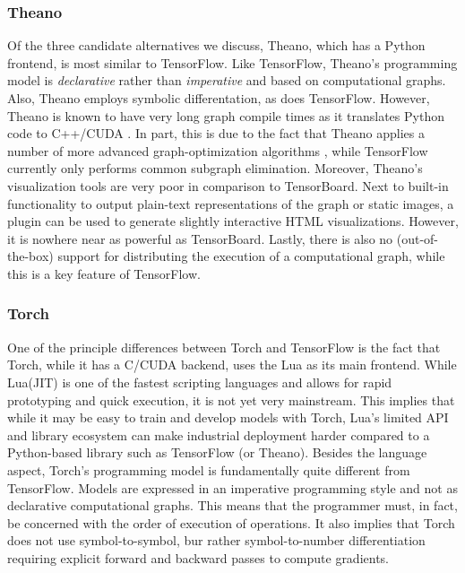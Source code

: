 \subsubsection{Theano}\label{sec:comp-quality-theano}

Of the three candidate alternatives we discuss, Theano, which has a Python
frontend, is most similar to TensorFlow. Like TensorFlow, Theano's programming
model is \emph{declarative} rather than \emph{imperative} and based on
computational graphs. Also, Theano employs symbolic differentation, as does
TensorFlow. However, Theano is known to have very long graph compile times as it
translates Python code to C++/CUDA \cite{theano}. In part, this is due to the
fact that Theano applies a number of more advanced graph-optimization algorithms
\cite{theano}, while TensorFlow currently only performs common subgraph
elimination. Moreover, Theano's visualization tools are very poor in comparison
to TensorBoard. Next to built-in functionality to output plain-text
representations of the graph or static images, a plugin can be used to generate
slightly interactive HTML visualizations. However, it is nowhere near as
powerful as TensorBoard. Lastly, there is also no (out-of-the-box) support for
distributing the execution of a computational graph, while this is a key feature
of TensorFlow.

\subsubsection{Torch}\label{sec:comp-quality-torch}

One of the principle differences between Torch and TensorFlow is the fact that
Torch, while it has a C/CUDA backend, uses the Lua as its main frontend. While
Lua(JIT) is one of the fastest scripting languages and allows for rapid
prototyping and quick execution, it is not yet very mainstream. This implies
that while it may be easy to train and develop models with Torch, Lua's limited
API and library ecosystem can make industrial deployment harder compared to a
Python-based library such as TensorFlow (or Theano). Besides the language
aspect, Torch's programming model is fundamentally quite different from
TensorFlow. Models are expressed in an imperative programming style and not as
declarative computational graphs. This means that the programmer must, in fact,
be concerned with the order of execution of operations. It also implies that
Torch does not use symbol-to-symbol, bur rather symbol-to-number differentiation
requiring explicit forward and backward passes to compute gradients.

